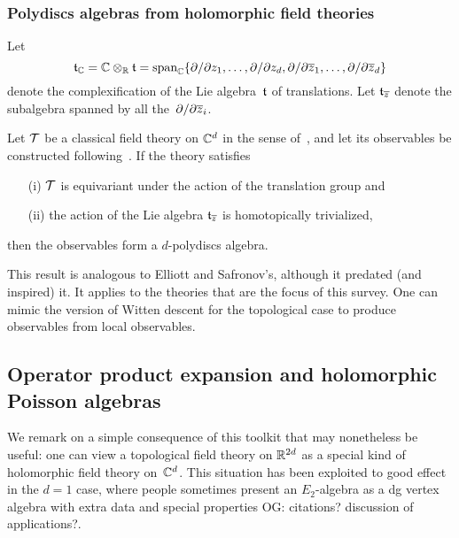 \documentclass[11pt]{amsart}
\def\owen#1{{\textcolor{violet!50!black}{OG: {#1}}}}
\begin{document}
\subsubsection{Polydiscs algebras from holomorphic field theories}

Let 
\[
\mathfrak t_\mathbb C = \mathbb C \otimes_\mathbb R \mathfrak t = \text{span}_{\mathbb C}\{\partial/\partial z_1, \ldots, \partial/\partial z_d, \partial/\partial {\overline{z}}_1, \ldots, \partial/\partial {\overline{z}}_d  \}
\]
denote the complexification of the Lie algebra~$\mathfrak t$ of translations.
Let $\mathfrak t_{{\overline{z}}}$ denote the subalgebra spanned by all the~$\partial/\partial {\overline{z}}_i$.

\begin{thm}[\cite{CG1},\owen{precise location}]
Let $\mathcal T$ be a classical field theory on $\mathbb C^d$ in the sense of~\cite{CosBook},
and let its observables be constructed following~\cite{CG2}.
If the theory satisfies 
\begin{enumerate}
\item[(i)] $\mathcal T$ is equivariant under the action of the translation group and
\item[(ii)] the action of the Lie algebra $\mathfrak t_{{\overline{z}}}$ is homotopically trivialized,
\end{enumerate}
then the observables form a $d$-polydiscs algebra.
\end{thm}

This result is analogous to Elliott and Safronov's, although it predated (and inspired) it.
It applies to the theories that are the focus of this survey.
One can mimic the version of Witten descent for the topological case to produce observables from local observables.

\subsection{Operator product expansion and holomorphic Poisson algebras}

We remark on a simple consequence of this toolkit that may nonetheless be useful:
one can view a topological field theory on $\mathbb R^{2d}$ as a special kind of holomorphic field theory on~$\mathbb C^{d}$.
This situation has been exploited to good effect in the $d=1$ case,
where people sometimes present an $E_2$-algebra as a dg vertex algebra with extra data and special properties \owen{citations? discussion of applications?}.
\end{document}
